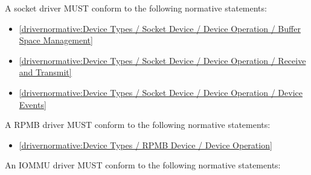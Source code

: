 \label{sec:Conformance / Driver Conformance / Socket Driver Conformance}

A socket driver MUST conform to the following normative statements:

\begin{itemize}
\item \ref{drivernormative:Device Types / Socket Device / Device Operation / Buffer Space Management}
\item \ref{drivernormative:Device Types / Socket Device / Device Operation / Receive and Transmit}
\item \ref{drivernormative:Device Types / Socket Device / Device Operation / Device Events}
\end{itemize}

\label{sec:Conformance / Driver Conformance / RPMB Driver Conformance}

A RPMB driver MUST conform to the following normative statements:

\begin{itemize}
\item \ref{drivernormative:Device Types / RPMB Device / Device Operation}
\end{itemize}
\label{sec:Conformance / Driver Conformance / IOMMU Driver Conformance}

An IOMMU driver MUST conform to the following normative statements:

